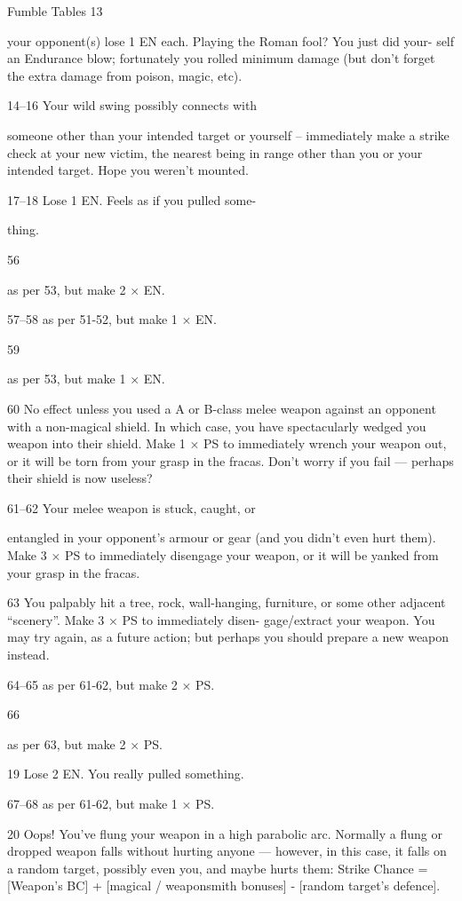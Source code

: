 \begin{Chapter}{Fumble Tables}
13  

your opponent(s) lose 1 EN each. 
Playing the Roman fool? You just did your-
self an Endurance blow; fortunately you 
rolled minimum damage (but don’t forget 
the extra damage from poison, magic, etc). 

14–16  Your wild swing possibly connects with 

someone other than your intended target or 
yourself – immediately make a strike check 
at your new victim, the nearest being in 
range other than you or your intended target. 
Hope you weren’t mounted. 

17–18  Lose 1 EN. Feels as if you pulled some-

thing. 

56  

as per 53, but make 2 × EN. 

57–58  as per 51-52, but make 1 × EN. 

59  

as per 53, but make 1 × EN. 

60   No effect unless you used a A or B-class 
melee weapon against an opponent with a 
non-magical shield. In which case, you have 
spectacularly wedged you weapon into their 
shield. Make 1 × PS to immediately wrench 
your weapon out, or it will be torn from 
your grasp in the fracas. Don’t worry if you 
fail — perhaps their shield is now useless? 

61–62  Your melee weapon is stuck, caught, or 

entangled in your opponent’s armour or gear 
(and you didn’t even hurt them). Make 3 × 
PS to immediately disengage your weapon, 
or it will be yanked from your grasp in the 
fracas. 

63   You palpably hit a tree, rock, wall-hanging, 
furniture, or some other adjacent “scenery”. 
Make 3 × PS to immediately disen-
gage/extract your weapon. You may try 
again, as a future action; but perhaps you 
should prepare a new weapon instead. 

64–65  as per 61-62, but make 2 × PS. 

66  

as per 63, but make 2 × PS. 

19   Lose 2 EN. You really pulled something. 

67–68  as per 61-62, but make 1 × PS. 

20   Oops! You’ve flung your weapon in a high 
parabolic arc. Normally a flung or dropped 
weapon falls without hurting anyone — 
however, in this case, it falls on a random 
target, possibly even you, and maybe hurts 
them: Strike Chance = [Weapon’s BC] + 
[magical / weaponsmith bonuses] - [random 
target’s defence]. 


\end{Chapter}
